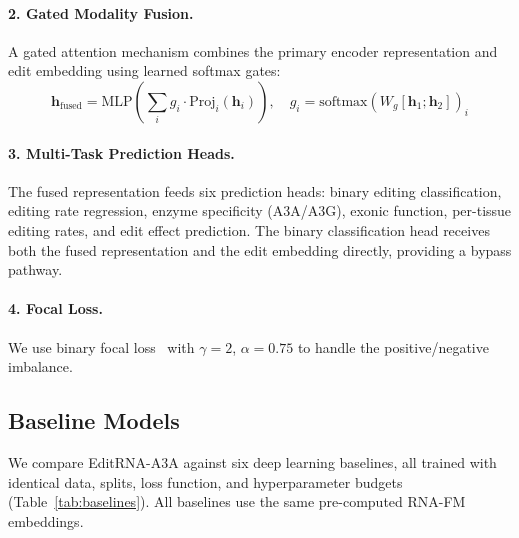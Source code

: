 \documentclass[11pt]{article}
\begin{document}
\paragraph{2. Gated Modality Fusion.}
A gated attention mechanism combines the primary encoder representation and
edit embedding using learned softmax gates:
\begin{equation}
  \mathbf{h}_{\text{fused}} = \text{MLP}\left(
    \sum_i g_i \cdot \text{Proj}_i(\mathbf{h}_i)
  \right), \quad
  g_i = \text{softmax}(W_g [\mathbf{h}_1; \mathbf{h}_2])_i
\end{equation}

\paragraph{3. Multi-Task Prediction Heads.}
The fused representation feeds six prediction heads: binary editing
classification, editing rate regression, enzyme specificity (A3A/A3G), exonic
function, per-tissue editing rates, and edit effect prediction. The binary
classification head receives both the fused representation and the edit embedding
directly, providing a bypass pathway.

\paragraph{4. Focal Loss.}
We use binary focal loss~\citep{lin2017focal} with $\gamma=2$, $\alpha=0.75$
to handle the positive/negative imbalance.

\subsection{Baseline Models}

We compare EditRNA-A3A against six deep learning baselines, all trained with
identical data, splits, loss function, and hyperparameter budgets
(Table~\ref{tab:baselines}). All baselines use the same pre-computed RNA-FM
embeddings.
\end{document}
